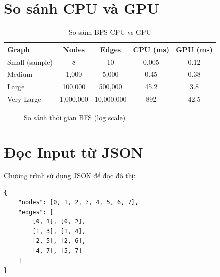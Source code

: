 \section{So sánh CPU và GPU}

\begin{table}[H]
\centering
\caption{So sánh BFS CPU vs GPU}
\label{tab:bfs_comparison}
\begin{tabular}{@{}lcccc@{}}
\toprule
\textbf{Graph} & \textbf{Nodes} & \textbf{Edges} & \textbf{CPU (ms)} & \textbf{GPU (ms)} \\
\midrule
Small (sample) & 8 & 10 & 0.005 & 0.12 \\
Medium & 1,000 & 5,000 & 0.45 & 0.38 \\
Large & 100,000 & 500,000 & 45.2 & 3.8 \\
Very Large & 1,000,000 & 10,000,000 & 892 & 42.5 \\
\bottomrule
\end{tabular}
\end{table}

\begin{figure}[H]
\centering
{}
\caption{So sánh thời gian BFS (log scale)}
\label{fig:bfs_benchmark}
\end{figure}

\section{Đọc Input từ JSON}

Chương trình sử dụng JSON để đọc đồ thị:

\begin{lstlisting}[caption={Ví dụ JSON input}, label={lst:json_input}]
{
    "nodes": [0, 1, 2, 3, 4, 5, 6, 7],
    "edges": [
        [0, 1], [0, 2],
        [1, 3], [1, 4],
        [2, 5], [2, 6],
        [4, 7], [5, 7]
    ]
}
\end{lstlisting}

